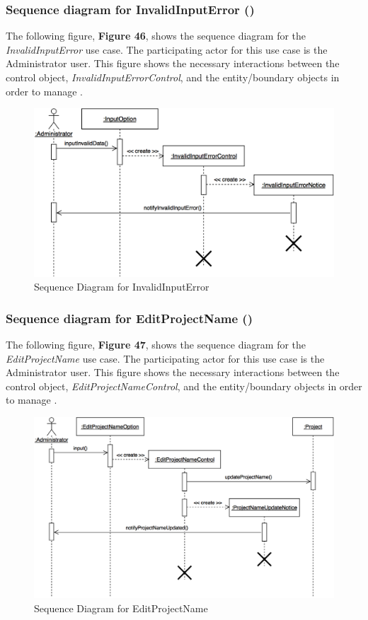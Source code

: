 \documentclass[12pt,letterpaper]{article}
\begin{document}
\subsubsection*{Sequence diagram for InvalidInputError (\invalidinputerror{})}

The following figure, {\bf Figure 46}, shows the sequence diagram for the {\it InvalidInputError} use case. The participating actor for this use case is
the Administrator user. This figure shows the necessary interactions between the control object, {\it InvalidInputErrorControl}, and the
entity/boundary objects in order to manage \invalidinputerror{}.

\begin{figure}[H]
	\centering{}
	\includegraphics[scale=0.3]{imgs/seq/invalid-input-error.png}
	\caption{Sequence Diagram for InvalidInputError}
\end{figure}

\subsubsection*{Sequence diagram for EditProjectName (\editprojectname{})}

The following figure, {\bf Figure 47}, shows the sequence diagram for the {\it EditProjectName} use case. The participating actor for this use case is
the Administrator user. This figure shows the necessary interactions between the control object, {\it EditProjectNameControl}, and the
entity/boundary objects in order to manage \editprojectname{}.

\begin{figure}[H]
	\centering{}
	\includegraphics[scale=0.3]{imgs/seq/edit-project-name.png}
	\caption{Sequence Diagram for EditProjectName}
\end{figure}
\end{document}
